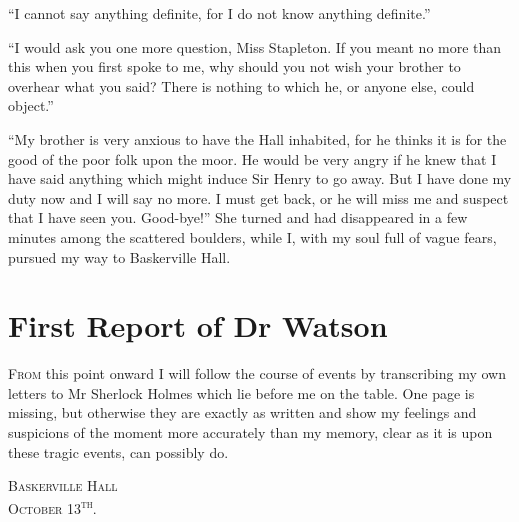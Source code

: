\documentclass[paper=a5,BCOR=7mm,twoside,DIV=calc,12pt,usegeometry,openany,chapterprefix,endperiod,headings=big]{scrbook} %
\begin{document}
\enquote{I cannot say anything definite, for I do not know anything definite.}

\enquote{I would ask you one more question, Miss Stapleton. If you meant no more than this when you first spoke to me, why should you not wish your brother to overhear what you said? There is nothing to which he, or anyone else, could object.}

\enquote{My brother is very anxious to have the Hall inhabited, for he thinks it is for the good of the poor folk upon the moor. He would be very angry if he knew that I have said anything which might induce Sir Henry to go away. But I have done my duty now and I will say no more. I must get back, or he will miss me and suspect that I have seen you. Good-bye!} She turned and had disappeared in a few minutes among the scattered boulders, while I, with my soul full of vague fears, pursued my way to Baskerville Hall.

\chapter{First Report of Dr Watson}
\lettrine[lines=1]{F}{rom} this point onward I will follow the course of events by transcribing my own letters to Mr Sherlock Holmes which lie before me on the table. One page is missing, but otherwise they are exactly as written and show my feelings and suspicions of the moment more accurately than my memory, clear as it is upon these tragic events, can possibly do.\\

\hfill\begin{minipage}{0.5\linewidth}\textsc{Baskerville Hall\\October 13\textsuperscript{th}.}\end{minipage}
\end{document}
